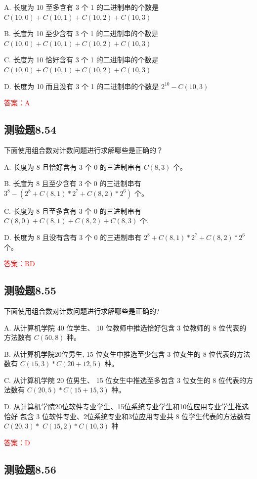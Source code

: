 \documentclass[UTF8, heading=true]{ctexart}
\begin{document}
A. 长度为 10 至多含有 3 个 1 的二进制串的个数是 $C(10,0)+C(10,1)+C(10,2)+C(10,3)$

B. 长度为 10 至少含有 3 个 1 的二进制串的个数是 $C(10,0)+C(10,1)+C(10,2)+C(10,3)$

C. 长度为 10 恰好含有 3 个 1 的二进制串的个数是 $C(10,0)+C(10,1)+C(10,2)+C(10,3)$

D. 长度为 10 而且没有 3 个 1 的二进制串的个数是 $2^{10}-C(10,3)$

\textcolor{red}{答案：A}

\subsection{测验题8.54}
下面使用组合数对计数问题进行求解哪些是正确的？

A. 长度为 8 且恰好含有 3 个 0 的三进制串有 $C(8,3)$ 个。

B. 长度为 8 且至少含有 3 个 0 的三进制串有 $3^8-\left(2^8+C(8,1) * 2^7+C(8,2) * 2^6\right)$ 个。

C. 长度为 8 且至多含有 3 个 0 的三进制串有 $C(8,0)+C(8,1)+C(8,2)+C(8,3)$ 个.

D. 长度为 8 且没有含有 3 个 0 的三进制串有 $2^8+C(8,1) * 2^7+C(8,2) * 2^6$ 个。

\textcolor{red}{答案：BD}

\subsection{测验题8.55}

下面使用组合数对计数问题进行求解哪些是正确的?

A. 从计算机学院 40 位学生、 10 位教师中推选恰好包含 3 位教师的 8 位代表的方法数有 $C(50,8)$ 种。

B. 从计算机学院20位男生, 15 位女生中推选至少包含 3 位女生的 8 位代表的方法数有 $C(15,3) * C(20+12,5)$ 种。

C. 从计算机学院 20 位男生、 15 位女生中推选至多包含 3 位女生的 8 位代表的方法数有 $C(20,5) * C(15+15,3)$ 种。

D. 从计算机学院20位软件专业学生、15位系统专业学生和10位应用专业学生推选恰好
包含 3 位软件专业、2位系统专业和3位应用专业共 8 位学生代表的方法数有 $C(20,3) *$ $C(15,2) * C(10,3)$ 种

\textcolor{red}{答案：D}

\subsection{测验题8.56}
\end{document}
